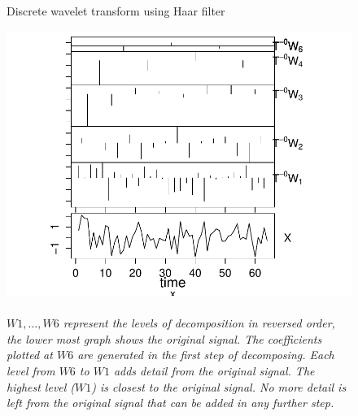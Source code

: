 \begin{figure}[H]
\caption{Discrete wavelet transform using Haar
filter}\label{figure:haar_transform}
\caption*{\\[0em]\footnotesize\emph{$W1, \ldots, W6$ represent the levels of
decomposition in reversed order, the lower most graph shows the original
signal. The coefficients plotted at $W6$ are generated in the first step of
decomposing. Each level from $W6$ to $W1$ adds detail from the original
signal. The highest level ($W1$) is closest to the original signal. No more
detail is left from the original signal that can be added in any further
step.}\\[1em]}
\centering
	\includegraphics[width=320pt]{images/dwt_haar.pdf}
\end{figure}